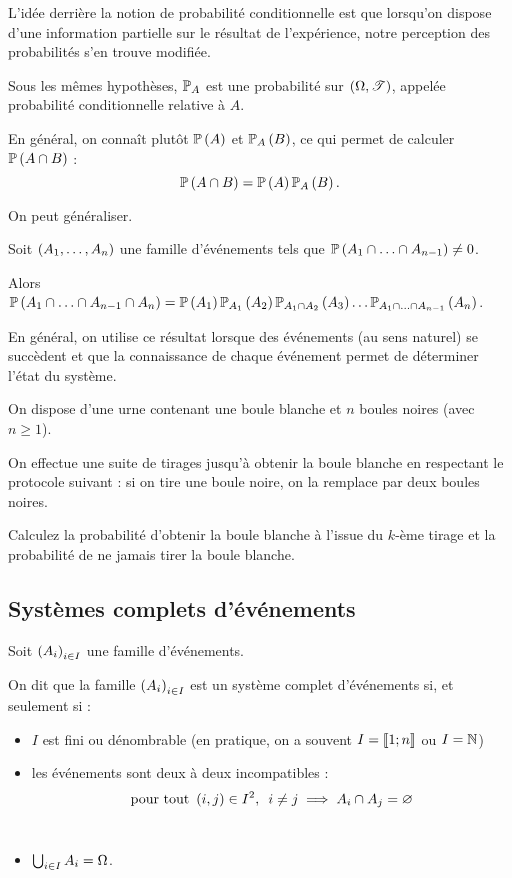 L'idée derrière la notion de probabilité conditionnelle est que lorsqu'on dispose d'une information partielle sur le résultat de l'expérience, notre perception des probabilités s'en trouve modifiée.

\begin{theo}
Sous les mêmes hypothèses, \(\prem_A\) est une probabilité sur \(\groupe{\Omega}[\fami{T}]\), appelée probabilité conditionnelle relative à \(A\).
\end{theo}

En général, on connaît plutôt \(\proba{A}\) et \(\probacond{B}{A}\), ce qui permet de calculer \(\proba{A\inter B}\) : \[\proba{A\inter B}=\proba{A}\probacond{B}{A}.\]

On peut généraliser.

\begin{theo}
Soit \(\paren{A_1,\dots,A_n}\) une famille d'événements tels que \(\proba{A_1\inter\dots\inter A_{n-1}}\not=0\).

Alors \(\proba{A_1\inter\dots\inter A_{n-1}\inter A_n}=\proba{A_1}\probacond{A_2}{A_1}\probacond{A_3}{A_1\inter A_2}\dots\probacond{A_n}{A_1\inter\dots\inter A_{n-1}}\).
\end{theo}

En général, on utilise ce résultat lorsque des événements (au sens naturel) se succèdent et que la connaissance de chaque événement permet de déterminer l'état du système.

\begin{exo}
On dispose d'une urne contenant une boule blanche et \(n\) boules noires (avec \(n\geq1\)).

On effectue une suite de tirages jusqu'à obtenir la boule blanche en respectant le protocole suivant : si on tire une boule noire, on la remplace par deux boules noires.

Calculez la probabilité d'obtenir la boule blanche à l'issue du \(k\)-ème tirage et la probabilité de ne jamais tirer la boule blanche.
\end{exo}

\subsection{Systèmes complets d'événements}

\begin{defi}
Soit \(\paren{A_i}_{i\in I}\) une famille d'événements.

On dit que la famille \(\paren{A_i}_{i\in I}\) est un système complet d'événements si, et seulement si :

\begin{itemize}
    \item \(I\) est fini ou dénombrable (en pratique, on a souvent \(I=\interventierii{1}{n}\) ou \(I=\N\)) \\
    \item les événements sont deux à deux incompatibles : \[\quantifs{\tpt\paren{i,j}\in I^2}i\not=j\imp A_i\inter A_j=\ensvide\] \\
    \item \(\bigunion_{i\in I}A_i=\Omega\).
\end{itemize}
\end{defi}

